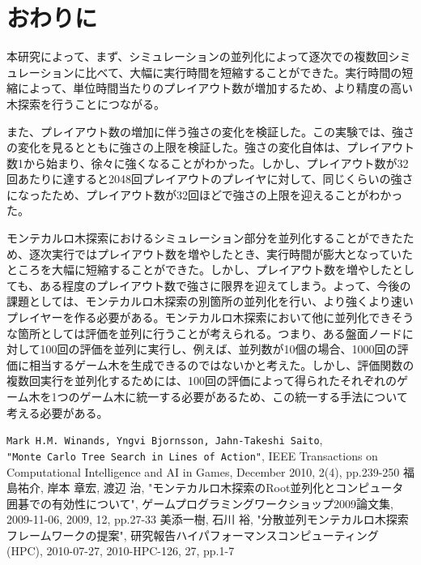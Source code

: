 \documentclass[10pt, a4paper]{jsarticle}
\begin{document}
\section{おわりに}
本研究によって、まず、シミュレーションの並列化によって逐次での複数回シミュレーションに比べて、大幅に実行時間を短縮することができた。実行時間の短縮によって、単位時間当たりのプレイアウト数が増加するため、より精度の高い木探索を行うことにつながる。
\par また、プレイアウト数の増加に伴う強さの変化を検証した。この実験では、強さの変化を見るとともに強さの上限を検証した。強さの変化自体は、プレイアウト数1から始まり、徐々に強くなることがわかった。しかし、プレイアウト数が32回あたりに達すると2048回プレイアウトのプレイヤに対して、同じくらいの強さになったため、プレイアウト数が32回ほどで強さの上限を迎えることがわかった。
\par モンテカルロ木探索におけるシミュレーション部分を並列化することができたため、逐次実行ではプレイアウト数を増やしたとき、実行時間が膨大となっていたところを大幅に短縮することができた。しかし、プレイアウト数を増やしたとしても、ある程度のプレイアウト数で強さに限界を迎えてしまう。よって、今後の課題としては、モンテカルロ木探索の別箇所の並列化を行い、より強くより速いプレイヤーを作る必要がある。モンテカルロ木探索において他に並列化できそうな箇所としては評価を並列に行うことが考えられる。つまり、ある盤面ノードに対して100回の評価を並列に実行し、例えば、並列数が10個の場合、1000回の評価に相当するゲーム木を生成できるのではないかと考えた。しかし、評価関数の複数回実行を並列化するためには、100回の評価によって得られたそれぞれのゲーム木を1つのゲーム木に統一する必要があるため、この統一する手法について考える必要がある。
\begin{thebibliography}{99}
     \verb#Mark H.M. Winands, Yngvi Bjornsson, Jahn-Takeshi Saito#, \\\verb#"Monte Carlo Tree Search in Lines of Action"#, IEEE Transactions on Computational Intelligence and AI in Games, December 2010, 2(4), pp.239-250
     福島祐介, 岸本 章宏, 渡辺 治, "モンテカルロ木探索のRoot並列化とコンピュータ囲碁での有効性について", ゲームプログラミングワークショップ2009論文集, 2009-11-06, 2009, 12, pp.27-33
     美添一樹, 石川 裕, "分散並列モンテカルロ木探索フレームワークの提案", 研究報告ハイパフォーマンスコンピューティング(HPC), 2010-07-27, 2010-HPC-126, 27, pp.1-7
\end{thebibliography}
\end{document}
